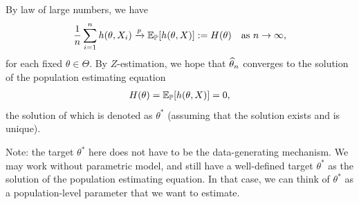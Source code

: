 \documentclass[11pt,letterpaper]{article}
\numberwithin{assumption}{lecture}
\numberwithin{theorem}{lecture}
\numberwithin{proposition}{lecture}
\numberwithin{lemma}{lecture}
\numberwithin{claim}{lecture}
\numberwithin{corollary}{lecture}
\numberwithin{definition}{lecture}
\numberwithin{conjecture}{lecture}
\numberwithin{remark}{lecture}
\numberwithin{example}{lecture}
\numberwithin{equation}{lecture}
\begin{document}
By law of large numbers, we have
\begin{align*}
  \frac{1}{n} \sum_{i=1}^n h(\theta, X_i) \xrightarrow{p} {\mathbb{E}}_{{\mathbb{P}}} [h(\theta, X)] := H(\theta) \quad \text{as } n \to \infty,
\end{align*}
for each fixed $\theta \in \Theta$. By $Z$-estimation, we hope that $\widehat{\theta}_n$ converges to the solution of the population estimating equation
\begin{align*}
  H(\theta) = {\mathbb{E}}_{{\mathbb{P}}} [h(\theta, X)] = 0,
\end{align*}
the solution of which is denoted as $\theta^*$ (assuming that the solution exists and is unique).

Note: the target $\theta^*$ here does not have to be the data-generating mechanism. We may work without parametric model, and still have a well-defined target $\theta^*$ as the solution of the population estimating equation. In that case, we can think of $\theta^*$ as a population-level parameter that we want to estimate.
\end{document}
